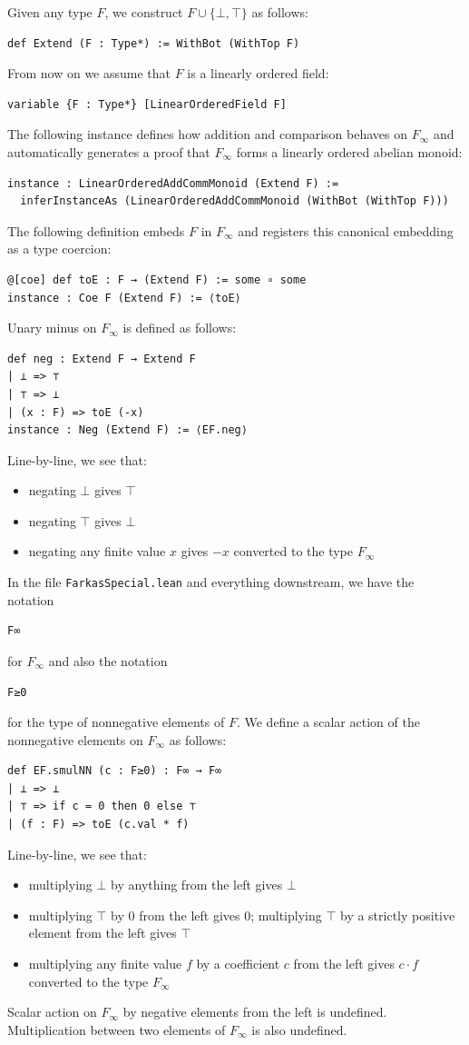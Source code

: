 \documentclass[]{article}
\renewcommand{\.}{\hskip .75pt}
\let\*=\cdot
\begin{document}
Given any type $F$, we construct $F \cup \{ \bot, \top \}$ as follows:
\begin{lstlisting}
def Extend (F : Type*) := WithBot (WithTop F)
\end{lstlisting}
From now on we assume that $F$ is a linearly ordered field:
\begin{lstlisting}
variable {F : Type*} [LinearOrderedField F]
\end{lstlisting}
The following instance defines how addition and comparison
behaves on $F_\infty$ and automatically generates a proof
that $F_\infty$ forms a linearly ordered abelian monoid:
\begin{lstlisting}
instance : LinearOrderedAddCommMonoid (Extend F) :=
  inferInstanceAs (LinearOrderedAddCommMonoid (WithBot (WithTop F)))
\end{lstlisting}
The following definition embeds $F$ in $F_\infty$ and registers
this canonical embedding as a type coercion:
\begin{lstlisting}
@[coe] def toE : F → (Extend F) := some ∘ some
instance : Coe F (Extend F) := ⟨toE⟩
\end{lstlisting} \pagebreak[2]
Unary minus on $F_\infty$ is defined as follows:
\begin{lstlisting}
def neg : Extend F → Extend F
| ⊥ => ⊤
| ⊤ => ⊥
| (x : F) => toE (-x)
instance : Neg (Extend F) := ⟨EF.neg⟩
\end{lstlisting}
Line-by-line, we see that:
\begin{itemize}
\item negating $\bot$ gives $\top$
\item negating $\top$ gives $\bot$
\item negating any finite value $x$ gives $-x$ converted to the type $F_\infty$
\end{itemize}
In the file \texttt{FarkasSpecial.lean} and everything downstream,
we have the notation
\begin{lstlisting}
F∞
\end{lstlisting}
for $F_\infty$ and also the notation
\begin{lstlisting}
F≥0
\end{lstlisting}
for the type of nonnegative elements of $F$.
We define a scalar action of the nonnegative elements
on $F_\infty$ as follows:
\begin{lstlisting}
def EF.smulNN (c : F≥0) : F∞ → F∞
| ⊥ => ⊥
| ⊤ => if c = 0 then 0 else ⊤
| (f : F) => toE (c.val * f)
\end{lstlisting}
Line-by-line, we see that:
\begin{itemize}
\item multiplying $\bot$ by anything from the left gives $\bot$
\item multiplying $\top$ by $0$ from the left gives $0$;
multiplying $\top$ by a strictly positive element from the left gives $\top$
\item multiplying any finite value $f$ by a coefficient $c$ from the left
gives $c \* f$ converted to the type $F_\infty$
\end{itemize}
Scalar action on $F_\infty$ by negative elements from the left is undefined.
Multiplication between two elements of $F_\infty$ is also undefined.
\end{document}
